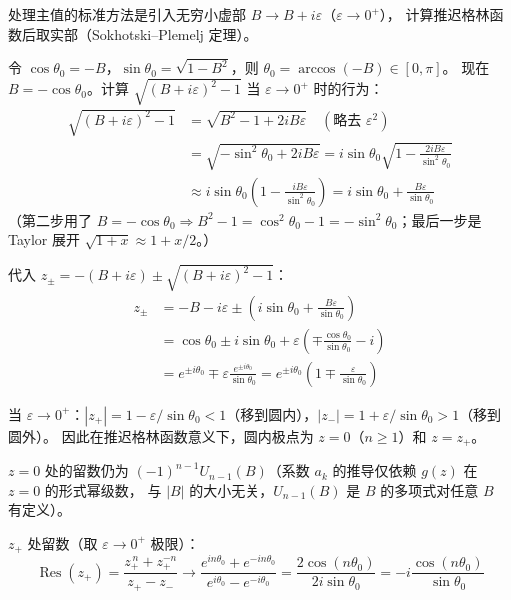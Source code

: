 \documentclass[12pt,a4paper]{ctexart}
\begin{document}
处理主值的标准方法是引入无穷小虚部 $B\to B+i\varepsilon$（$\varepsilon\to0^+$），
计算推迟格林函数后取实部（Sokhotski--Plemelj 定理）。

令 $\cos\theta_0=-B$，$\sin\theta_0=\sqrt{1-B^2}$，则 $\theta_0=\arccos(-B)\in[0,\pi]$。
现在 $B=-\cos\theta_0$。计算 $\sqrt{(B+i\varepsilon)^2-1}$ 当 $\varepsilon\to0^+$ 时的行为：
\begin{equation}
\begin{aligned}
\sqrt{(B+i\varepsilon)^2-1}
&=\sqrt{B^2-1+2iB\varepsilon} \quad(\text{略去 }\varepsilon^2)\\[4pt]
&=\sqrt{-\sin^2\theta_0+2iB\varepsilon}
 =i\sin\theta_0\sqrt{1-\frac{2iB\varepsilon}{\sin^2\theta_0}} \\[4pt]
&\approx i\sin\theta_0\left(1-\frac{iB\varepsilon}{\sin^2\theta_0}\right)
 =i\sin\theta_0+\frac{B\varepsilon}{\sin\theta_0}
\end{aligned}
\end{equation}
（第二步用了 $B=-\cos\theta_0\Rightarrow B^2-1=\cos^2\theta_0-1=-\sin^2\theta_0$；最后一步是 Taylor 展开 $\sqrt{1+x}\approx1+x/2$。）

代入 $z_{\pm}=-(B+i\varepsilon)\pm\sqrt{(B+i\varepsilon)^2-1}$：
\begin{equation}
\begin{aligned}
z_{\pm}&=-B-i\varepsilon\pm\left(i\sin\theta_0+\frac{B\varepsilon}{\sin\theta_0}\right) \\[4pt]
&=\cos\theta_0\pm i\sin\theta_0
   +\varepsilon\left(\mp\frac{\cos\theta_0}{\sin\theta_0}-i\right) \\[4pt]
&=e^{\pm i\theta_0}\mp\varepsilon\frac{e^{\pm i\theta_0}}{\sin\theta_0}
 =e^{\pm i\theta_0}\left(1\mp\frac{\varepsilon}{\sin\theta_0}\right)
\end{aligned}
\end{equation}

当 $\varepsilon\to0^+$：$|z_+|=1-\varepsilon/\sin\theta_0<1$（移到圆内），$|z_-|=1+\varepsilon/\sin\theta_0>1$（移到圆外）。
因此在推迟格林函数意义下，圆内极点为 $z=0$（$n\geq1$）和 $z=z_+$。

$z=0$ 处的留数仍为 $(-1)^{n-1}U_{n-1}(B)$（系数 $a_k$ 的推导仅依赖 $g(z)$ 在 $z=0$ 的形式幂级数，
与 $|B|$ 的大小无关，$U_{n-1}(B)$ 是 $B$ 的多项式对任意 $B$ 有定义）。

$z_+$ 处留数（取 $\varepsilon\to0^+$ 极限）：
\begin{equation}
\operatorname{Res}(z_+)=\frac{z_+^{\,n}+z_+^{-n}}{z_+-z_-}
\to\frac{e^{in\theta_0}+e^{-in\theta_0}}{e^{i\theta_0}-e^{-i\theta_0}}
=\frac{2\cos(n\theta_0)}{2i\sin\theta_0}
=-i\frac{\cos(n\theta_0)}{\sin\theta_0}
\end{equation}
\end{document}
